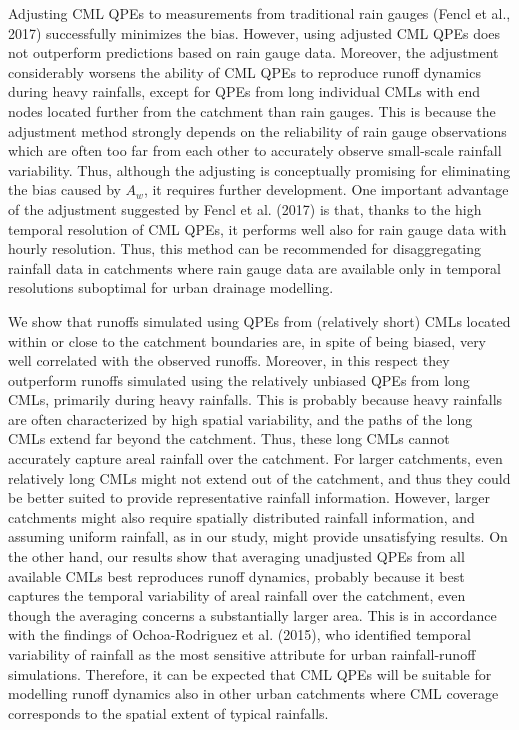 \documentclass{ctuthesis}\usepackage[]{graphicx}\usepackage[]{color}
\begin{document}
Adjusting CML QPEs to measurements from traditional rain gauges (Fencl et al., 2017) successfully minimizes the bias. However, using adjusted CML QPEs does not outperform predictions based on rain gauge data. Moreover, the adjustment considerably worsens the ability of CML QPEs to reproduce runoff dynamics during heavy rainfalls, except for QPEs from long individual CMLs with end nodes located further from the catchment than rain gauges. This is because the adjustment method strongly depends on the reliability of rain gauge observations which are often too far from each other to accurately observe small-scale rainfall variability. Thus, although the adjusting is conceptually promising for eliminating the bias caused by $A_w$, it requires further development. One important advantage of the adjustment suggested by Fencl et al. (2017) is that, thanks to the high temporal resolution of CML QPEs, it performs well also for rain gauge data with hourly resolution. Thus, this method can be recommended for disaggregating rainfall data in catchments where rain gauge data are available only in temporal resolutions suboptimal for urban drainage modelling.

We show that runoffs simulated using QPEs from (relatively short) CMLs located within or close to the catchment boundaries are, in spite of being biased, very well correlated with the observed runoffs. Moreover, in this respect they outperform runoffs simulated using the relatively unbiased QPEs from long CMLs, primarily during heavy rainfalls. This is probably because heavy rainfalls are often characterized by high spatial variability, and the paths of the long CMLs extend far beyond the catchment. Thus, these long CMLs cannot accurately capture areal rainfall over the catchment. For larger catchments, even relatively long CMLs might not extend out of the catchment, and thus they could be better suited to provide representative rainfall information. However, larger catchments might also require spatially distributed rainfall information, and assuming uniform rainfall, as in our study, might provide unsatisfying results. On the other hand, our results show that averaging unadjusted QPEs from all available CMLs best reproduces runoff dynamics, probably because it best captures the temporal variability of areal rainfall over the catchment, even though the averaging concerns a substantially larger area. This is in accordance with the findings of Ochoa-Rodriguez et al. (2015), who identified temporal variability of rainfall as the most sensitive attribute for urban rainfall-runoff simulations. Therefore, it can be expected that CML QPEs will be suitable for modelling runoff dynamics also in other urban catchments where CML coverage corresponds to the spatial extent of typical rainfalls.
\end{document}
